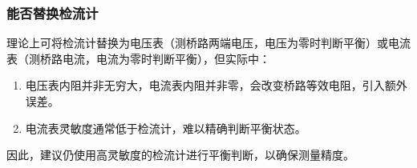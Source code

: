 \documentclass[]{../../templates/Report}%
\begin{document}
\begin{fullreportonly}
\subsubsection{能否替换检流计}
理论上可将检流计替换为电压表（测桥路两端电压，电压为零时判断平衡）或电流表（测桥路电流，电流为零时判断平衡），但实际中：
\begin{enumerate}
   \item 电压表内阻并非无穷大，电流表内阻并非零，会改变桥路等效电阻，引入额外误差。
   \item 电流表灵敏度通常低于检流计，难以精确判断平衡状态。
\end{enumerate}
因此，建议仍使用高灵敏度的检流计进行平衡判断，以确保测量精度。

\end{fullreportonly}
\insertnotes
\end{document}
